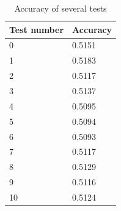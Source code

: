 \documentclass[a4paper]{report}
\begin{document}
		
		\begin{table}
			\centering
				\begin{tabular}{l|l}
				\hline
				Test number & Accuracy \\
				\hline \hline
				0 & 0.5151 \\
				1 & 0.5183 \\
				2 & 0.5117 \\
				3 & 0.5137 \\
				4 & 0.5095 \\
				5 & 0.5094 \\
				6 & 0.5093 \\
				7 & 0.5117 \\
				8 & 0.5129 \\
				9 & 0.5116 \\
				10 & 0.5124 \\
				\hline
				\end{tabular}
			\caption{\label{tab:VarZeropertAcc}Accuracy of several tests}
		\end{table}
		
\end{document}

